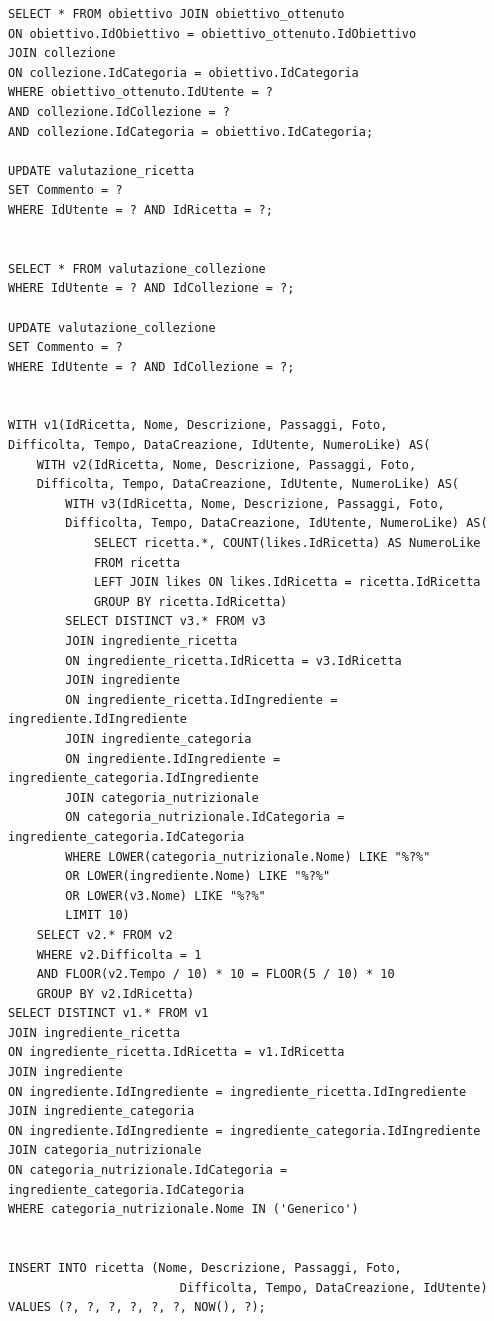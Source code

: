 ﻿\documentclass[a4paper,12pt]{report}
\begin{document}
\begin{verbatim}
SELECT * FROM obiettivo JOIN obiettivo_ottenuto
ON obiettivo.IdObiettivo = obiettivo_ottenuto.IdObiettivo
JOIN collezione
ON collezione.IdCategoria = obiettivo.IdCategoria
WHERE obiettivo_ottenuto.IdUtente = ?
AND collezione.IdCollezione = ?
AND collezione.IdCategoria = obiettivo.IdCategoria;

UPDATE valutazione_ricetta
SET Commento = ?
WHERE IdUtente = ? AND IdRicetta = ?;


SELECT * FROM valutazione_collezione
WHERE IdUtente = ? AND IdCollezione = ?;

UPDATE valutazione_collezione
SET Commento = ?
WHERE IdUtente = ? AND IdCollezione = ?;


WITH v1(IdRicetta, Nome, Descrizione, Passaggi, Foto,
Difficolta, Tempo, DataCreazione, IdUtente, NumeroLike) AS(
    WITH v2(IdRicetta, Nome, Descrizione, Passaggi, Foto, 
    Difficolta, Tempo, DataCreazione, IdUtente, NumeroLike) AS(
        WITH v3(IdRicetta, Nome, Descrizione, Passaggi, Foto, 
        Difficolta, Tempo, DataCreazione, IdUtente, NumeroLike) AS(
            SELECT ricetta.*, COUNT(likes.IdRicetta) AS NumeroLike
            FROM ricetta
            LEFT JOIN likes ON likes.IdRicetta = ricetta.IdRicetta
            GROUP BY ricetta.IdRicetta)
        SELECT DISTINCT v3.* FROM v3
        JOIN ingrediente_ricetta
        ON ingrediente_ricetta.IdRicetta = v3.IdRicetta
        JOIN ingrediente
        ON ingrediente_ricetta.IdIngrediente = ingrediente.IdIngrediente
        JOIN ingrediente_categoria
        ON ingrediente.IdIngrediente = ingrediente_categoria.IdIngrediente
        JOIN categoria_nutrizionale 
        ON categoria_nutrizionale.IdCategoria = ingrediente_categoria.IdCategoria
        WHERE LOWER(categoria_nutrizionale.Nome) LIKE "%?%"
        OR LOWER(ingrediente.Nome) LIKE "%?%"
        OR LOWER(v3.Nome) LIKE "%?%"
        LIMIT 10)
    SELECT v2.* FROM v2
    WHERE v2.Difficolta = 1
    AND FLOOR(v2.Tempo / 10) * 10 = FLOOR(5 / 10) * 10 
    GROUP BY v2.IdRicetta)
SELECT DISTINCT v1.* FROM v1
JOIN ingrediente_ricetta
ON ingrediente_ricetta.IdRicetta = v1.IdRicetta
JOIN ingrediente
ON ingrediente.IdIngrediente = ingrediente_ricetta.IdIngrediente
JOIN ingrediente_categoria
ON ingrediente.IdIngrediente = ingrediente_categoria.IdIngrediente
JOIN categoria_nutrizionale
ON categoria_nutrizionale.IdCategoria = ingrediente_categoria.IdCategoria
WHERE categoria_nutrizionale.Nome IN ('Generico')


INSERT INTO ricetta (Nome, Descrizione, Passaggi, Foto,
                        Difficolta, Tempo, DataCreazione, IdUtente)
VALUES (?, ?, ?, ?, ?, ?, NOW(), ?);


\end{verbatim}
\end{document}
